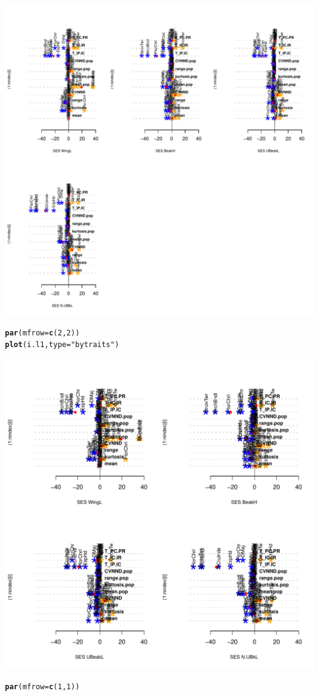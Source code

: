 \documentclass[12pt]{article}\usepackage[]{graphicx}\usepackage[]{color}
\makeatletter
\def\maxwidth{ %
  \ifdim\Gin@nat@width>\linewidth
    \linewidth
  \else
    \Gin@nat@width
  \fi
}
\newcommand{\hlnum}[1]{\textcolor[rgb]{0.686,0.059,0.569}{#1}}%
\newcommand{\hlstr}[1]{\textcolor[rgb]{0.192,0.494,0.8}{#1}}%
\newcommand{\hlstd}[1]{\textcolor[rgb]{0.345,0.345,0.345}{#1}}%
\newcommand{\hlkwc}[1]{\textcolor[rgb]{0.333,0.667,0.333}{#1}}%
\newcommand{\hlkwd}[1]{\textcolor[rgb]{0.737,0.353,0.396}{\textbf{#1}}}%
\newenvironment{kframe}{%
 \def\at@end@of@kframe{}%
 \ifinner\ifhmode%
  \def\at@end@of@kframe{\end{minipage}}%
  \begin{minipage}{\columnwidth}%
 \fi\fi%
 \def\FrameCommand##1{\hskip\@totalleftmargin \hskip-\fboxsep
 \colorbox{shadecolor}{##1}\hskip-\fboxsep
     \hskip-\linewidth \hskip-\@totalleftmargin \hskip\columnwidth}%
 \MakeFramed {\advance\hsize-\width
   \@totalleftmargin\z@ \linewidth\hsize
   \@setminipage}}%
 {\par\unskip\endMakeFramed%
 \at@end@of@kframe}
\newenvironment{knitrout}{}{} %
\makeatother
\begin{document}
\begin{knitrout}
\includegraphics[width=\maxwidth]{figure/unnamed-chunk-321} 
\begin{kframe}\begin{alltt}
\hlkwd{par}\hlstd{(}\hlkwc{mfrow} \hlstd{=} \hlkwd{c}\hlstd{(}\hlnum{2}\hlstd{,} \hlnum{2}\hlstd{))}
\hlkwd{plot}\hlstd{(i.l1,} \hlkwc{type} \hlstd{=} \hlstr{"bytraits"}\hlstd{)}
\end{alltt}
\end{kframe}
\includegraphics[width=\maxwidth]{figure/unnamed-chunk-322} 
\begin{kframe}\begin{alltt}
\hlkwd{par}\hlstd{(}\hlkwc{mfrow} \hlstd{=} \hlkwd{c}\hlstd{(}\hlnum{1}\hlstd{,} \hlnum{1}\hlstd{))}
\end{alltt}
\end{kframe}
\end{knitrout}
\end{document}

